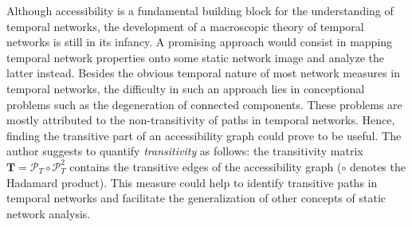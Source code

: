 Although accessibility is a fundamental building block for the understanding of temporal networks, the development of a macroscopic theory of temporal networks is still in its infancy.
A promising approach would consist in mapping temporal network properties onto some static network image and analyze the latter instead.
Besides the obvious temporal nature of most network measures in temporal networks, the difficulty in such an approach lies in conceptional problems such as the degeneration of connected components.
These problems are mostly attributed to the non-transitivity of paths in temporal networks.
Hence, finding the transitive part of an accessibility graph could prove to be useful.
The author suggests to quantify \emph{transitivity} as follows: the transitivity matrix $\mathbf{T}=\mathcal{P}_T\circ \mathcal{P}_T ^2$ contains the transitive edges of the accessibility graph ($\circ $ denotes the Hadamard product).
This measure could help to identify transitive paths in temporal networks and facilitate the generalization of other concepts of static network analysis.





